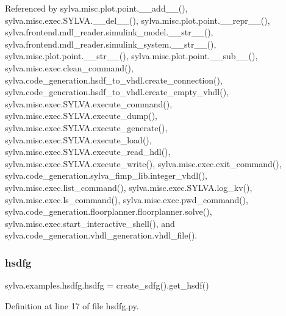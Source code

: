 Referenced by sylva.\+misc.\+plot.\+point.\+\_\+\+\_\+add\+\_\+\+\_\+(), sylva.\+misc.\+exec.\+S\+Y\+L\+V\+A.\+\_\+\+\_\+del\+\_\+\+\_\+(), sylva.\+misc.\+plot.\+point.\+\_\+\+\_\+repr\+\_\+\+\_\+(), sylva.\+frontend.\+mdl\+\_\+reader.\+simulink\+\_\+model.\+\_\+\+\_\+str\+\_\+\+\_\+(), sylva.\+frontend.\+mdl\+\_\+reader.\+simulink\+\_\+system.\+\_\+\+\_\+str\+\_\+\+\_\+(), sylva.\+misc.\+plot.\+point.\+\_\+\+\_\+str\+\_\+\+\_\+(), sylva.\+misc.\+plot.\+point.\+\_\+\+\_\+sub\+\_\+\+\_\+(), sylva.\+misc.\+exec.\+clean\+\_\+command(), sylva.\+code\+\_\+generation.\+hsdf\+\_\+to\+\_\+vhdl.\+create\+\_\+connection(), sylva.\+code\+\_\+generation.\+hsdf\+\_\+to\+\_\+vhdl.\+create\+\_\+empty\+\_\+vhdl(), sylva.\+misc.\+exec.\+S\+Y\+L\+V\+A.\+execute\+\_\+command(), sylva.\+misc.\+exec.\+S\+Y\+L\+V\+A.\+execute\+\_\+dump(), sylva.\+misc.\+exec.\+S\+Y\+L\+V\+A.\+execute\+\_\+generate(), sylva.\+misc.\+exec.\+S\+Y\+L\+V\+A.\+execute\+\_\+load(), sylva.\+misc.\+exec.\+S\+Y\+L\+V\+A.\+execute\+\_\+read\+\_\+hdl(), sylva.\+misc.\+exec.\+S\+Y\+L\+V\+A.\+execute\+\_\+write(), sylva.\+misc.\+exec.\+exit\+\_\+command(), sylva.\+code\+\_\+generation.\+sylva\+\_\+fimp\+\_\+lib.\+integer\+\_\+vhdl(), sylva.\+misc.\+exec.\+list\+\_\+command(), sylva.\+misc.\+exec.\+S\+Y\+L\+V\+A.\+log\+\_\+kv(), sylva.\+misc.\+exec.\+ls\+\_\+command(), sylva.\+misc.\+exec.\+pwd\+\_\+command(), sylva.\+code\+\_\+generation.\+floorplanner.\+floorplanner.\+solve(), sylva.\+misc.\+exec.\+start\+\_\+interactive\+\_\+shell(), and sylva.\+code\+\_\+generation.\+vhdl\+\_\+generation.\+vhdl\+\_\+file().

\mbox{\label{namespacesylva_1_1examples_1_1hsdfg_a06352bdbd263f95950fdc8603fb107f0}} 
\subsubsection{\texorpdfstring{hsdfg}{hsdfg}}
{\footnotesize\ttfamily sylva.\+examples.\+hsdfg.\+hsdfg = create\+\_\+sdfg().get\+\_\+hsdf()}



Definition at line 17 of file hsdfg.\+py.

